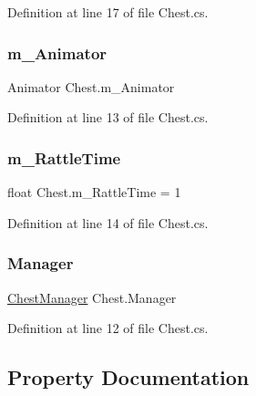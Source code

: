 Definition at line 17 of file Chest.\+cs.

\mbox{\label{class_chest_a455179664d3fcbbbb12f62ddc0d39e0b}} 
\subsubsection{\texorpdfstring{m\+\_\+\+Animator}{m\_Animator}}
{\footnotesize\ttfamily Animator Chest.\+m\+\_\+\+Animator}



Definition at line 13 of file Chest.\+cs.

\mbox{\label{class_chest_a8641eecb8e8c999aa4ec8736c761f653}} 
\subsubsection{\texorpdfstring{m\+\_\+\+Rattle\+Time}{m\_RattleTime}}
{\footnotesize\ttfamily float Chest.\+m\+\_\+\+Rattle\+Time = 1}



Definition at line 14 of file Chest.\+cs.

\mbox{\label{class_chest_a012418cebfc5cd47f8327ca22a52caac}} 
\subsubsection{\texorpdfstring{Manager}{Manager}}
{\footnotesize\ttfamily \mbox{\hyperlink{class_chest_manager}{Chest\+Manager}} Chest.\+Manager}



Definition at line 12 of file Chest.\+cs.



\subsection{Property Documentation}
\mbox{\label{class_chest_af0b0b442ab855da49092676fe578b6d9}} 
